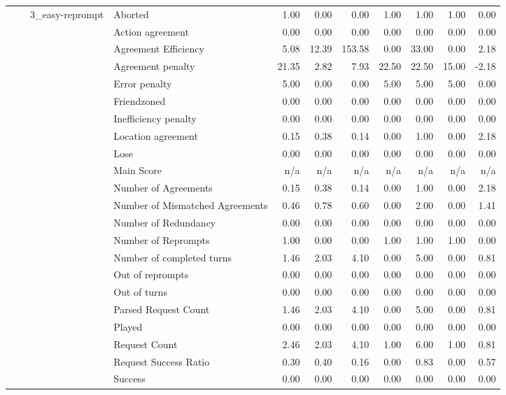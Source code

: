 \begin{tabular}{llllrrrrrrr}
 &  & \multirow[t]{27}{*}{3_easy-reprompt} & Aborted & 1.00 & 0.00 & 0.00 & 1.00 & 1.00 & 1.00 & 0.00 \\
 &  &  & Action agreement & 0.00 & 0.00 & 0.00 & 0.00 & 0.00 & 0.00 & 0.00 \\
 &  &  & Agreement Efficiency & 5.08 & 12.39 & 153.58 & 0.00 & 33.00 & 0.00 & 2.18 \\
 &  &  & Agreement penalty & 21.35 & 2.82 & 7.93 & 22.50 & 22.50 & 15.00 & -2.18 \\
 &  &  & Error penalty & 5.00 & 0.00 & 0.00 & 5.00 & 5.00 & 5.00 & 0.00 \\
 &  &  & Friendzoned & 0.00 & 0.00 & 0.00 & 0.00 & 0.00 & 0.00 & 0.00 \\
 &  &  & Inefficiency penalty & 0.00 & 0.00 & 0.00 & 0.00 & 0.00 & 0.00 & 0.00 \\
 &  &  & Location agreement & 0.15 & 0.38 & 0.14 & 0.00 & 1.00 & 0.00 & 2.18 \\
 &  &  & Lose & 0.00 & 0.00 & 0.00 & 0.00 & 0.00 & 0.00 & 0.00 \\
 &  &  & Main Score & n/a & n/a & n/a & n/a & n/a & n/a & n/a \\
 &  &  & Number of Agreements & 0.15 & 0.38 & 0.14 & 0.00 & 1.00 & 0.00 & 2.18 \\
 &  &  & Number of Mismatched Agreements & 0.46 & 0.78 & 0.60 & 0.00 & 2.00 & 0.00 & 1.41 \\
 &  &  & Number of Redundancy & 0.00 & 0.00 & 0.00 & 0.00 & 0.00 & 0.00 & 0.00 \\
 &  &  & Number of Reprompts & 1.00 & 0.00 & 0.00 & 1.00 & 1.00 & 1.00 & 0.00 \\
 &  &  & Number of completed turns & 1.46 & 2.03 & 4.10 & 0.00 & 5.00 & 0.00 & 0.81 \\
 &  &  & Out of reprompts & 0.00 & 0.00 & 0.00 & 0.00 & 0.00 & 0.00 & 0.00 \\
 &  &  & Out of turns & 0.00 & 0.00 & 0.00 & 0.00 & 0.00 & 0.00 & 0.00 \\
 &  &  & Parsed Request Count & 1.46 & 2.03 & 4.10 & 0.00 & 5.00 & 0.00 & 0.81 \\
 &  &  & Played & 0.00 & 0.00 & 0.00 & 0.00 & 0.00 & 0.00 & 0.00 \\
 &  &  & Request Count & 2.46 & 2.03 & 4.10 & 1.00 & 6.00 & 1.00 & 0.81 \\
 &  &  & Request Success Ratio & 0.30 & 0.40 & 0.16 & 0.00 & 0.83 & 0.00 & 0.57 \\
 &  &  & Success & 0.00 & 0.00 & 0.00 & 0.00 & 0.00 & 0.00 & 0.00 \\

\end{tabular}
